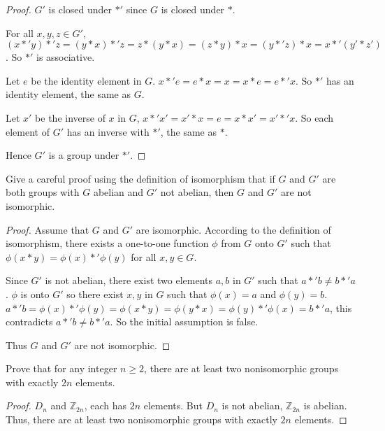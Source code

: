 \begin{proof}
    $G'$ is closed under $*'$ since $G$ is closed under $*$.

    For all $x, y, z\in G'$, $(x *' y) *' z = (y * x) *' z = z * (y * x) = (z * y) * x = (y *' z) * x = x *' (y' * z')$. So $*'$ is associative.

    Let $e$ be the identity element in $G$. $x *' e = e * x = x = x * e = e *' x$. So $*'$ has an identity element, the same as $G$.

    Let $x'$ be the inverse of $x$ in $G$, $x *' x' = x' * x = e = x * x' = x' *' x$. So each element of $G'$ has an inverse with $*'$, the same as $*$.

    Hence $G'$ is a group under $*'$.
\end{proof}

\newpage
\begin{exercise}
    Give a careful proof using the definition of isomorphism that if $G$ and $G'$ are both groups with $G$ abelian and $G'$ not abelian, then $G$ and $G'$ are not isomorphic.
\end{exercise}

\begin{proof}
    Assume that $G$ and $G'$ are isomorphic. According to the definition of isomorphism, there exists a one-to-one function $\phi$ from $G$ onto $G'$ such that $\phi(x * y) = \phi(x) *' \phi(y)$ for all $x, y\in G$.

    Since $G'$ is not abelian, there exist two elements $a, b$ in $G'$ such that $a *' b \ne b *' a$. $\phi$ is onto $G'$ so there exist $x, y$ in $G$ such that $\phi(x) = a$ and $\phi(y) = b$. $a *' b = \phi(x) *' \phi(y) = \phi(x * y) = \phi(y * x) = \phi(y) *' \phi(x) = b *' a$, this contradicts $a *'b \ne b *' a$. So the initial assumption is false.

    Thus $G$ and $G'$ are not isomorphic.
\end{proof}

\newpage
\begin{exercise}
    Prove that for any integer $n\geq 2$, there are at least two nonisomorphic groups with exactly $2n$ elements.
\end{exercise}

\begin{proof}
    $D_{n}$ and $\mathbb{Z}_{2n}$, each has $2n$ elements. But $D_{n}$ is not abelian, $\mathbb{Z}_{2n}$ is abelian. Thus, there are at least two nonisomorphic groups with exactly $2n$ elements.
\end{proof}

